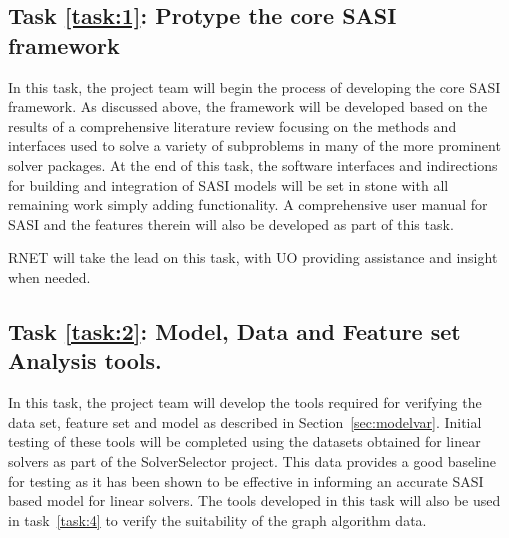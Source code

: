 %

\setcounter{taskCount}{0}

\label{task:1}
\subsection{Task \ref{task:1}: Protype the core SASI framework}
In this task, the project team will begin the process of developing the core SASI framework. As discussed above, the framework
will be developed based on the results of a comprehensive literature review focusing on the methods 
and interfaces used to solve a variety of subproblems in many of the more prominent solver packages.
At the end of this task, the software interfaces and indirections for building and integration of SASI models 
will be set in stone with all remaining work simply adding functionality. A comprehensive user manual for SASI and
the features therein will also be developed as part of this task. 

RNET will take the lead on this task, with UO providing assistance and insight when needed. 

\label{task:2}
\subsection{Task \ref{task:2}: Model, Data and Feature set Analysis tools. }
In this task, the project team will develop the tools required for verifying the data set, feature set and model as described in Section~\ref{sec:modelvar}. Initial testing of these tools will be completed using the datasets obtained for linear solvers as part of the SolverSelector project. This data provides a good baseline for testing as it has been shown to be effective in informing an accurate SASI based model for linear solvers. The tools developed in this task will also be used in task~\ref{task:4} to verify the suitability of the graph algorithm data. 

